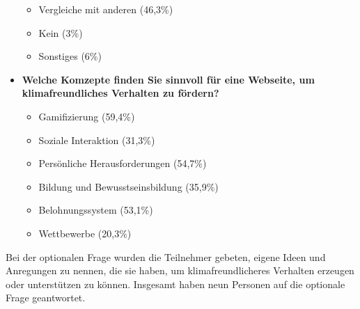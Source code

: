 \begin{itemize}
\begin{itemize}
        \item Vergleiche mit anderen (46,3\%)
        \item Kein (3\%)
        \item Sonstiges (6\%)
    \end{itemize}
    \item \textbf{Welche Komzepte finden Sie sinnvoll für eine Webseite, um klimafreundliches Verhalten zu fördern?}
    \begin{itemize}
        \item Gamifizierung (59,4\%)
        \item Soziale Interaktion (31,3\%)
        \item Persönliche Herausforderungen (54,7\%)
        \item Bildung und Bewusstseinsbildung (35,9\%)
        \item Belohnungssystem (53,1\%)
        \item Wettbewerbe (20,3\%)
    \end{itemize}
\end{itemize}

Bei der optionalen Frage wurden die Teilnehmer gebeten, eigene Ideen und Anregungen zu nennen, die sie haben, um klimafreundlicheres Verhalten erzeugen oder unterstützen zu können.
Insgesamt haben neun Personen auf die optionale Frage geantwortet.

